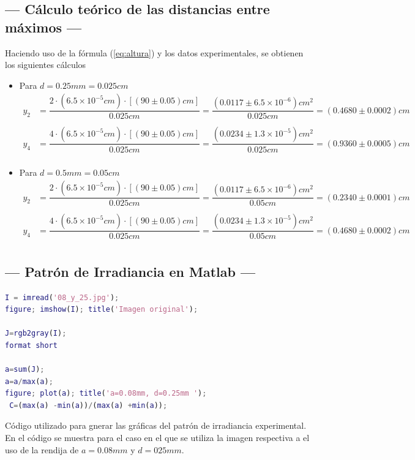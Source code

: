 \documentclass[12pt,a4paper]{article}
\begin{document}
	\subsection{--- Cálculo teórico de las distancias entre máximos ---}	
	Haciendo uso de la fórmula (\ref{eq:altura}) y los datos experimentales, se obtienen los siguientes cálculos
	\begin{itemize}
		\item Para $ d=0.25mm=0.025cm $
		\begin{align*}
			y_2&=\dfrac{2\cdot (6.5\times10^{-5}cm)\cdot[(90\pm 0.05) cm]}{0.025 cm}=
			\dfrac{(0.0117\pm 6.5\times 10^{-6}) cm^2}{0.025 cm}=
			(0.4680\pm 0.0002)cm\\\\
			y_4&=\dfrac{4\cdot (6.5\times10^{-5}cm)\cdot[(90\pm 0.05) cm]}{0.025 cm}=
			\dfrac{(0.0234\pm1.3\times 10^{-5})cm^2}{0.025 cm}=
			(0.9360\pm0.0005)cm\\
		\end{align*}
		\item Para $ d=0.5mm=0.05cm $
		\begin{align*}
			y_2&=\dfrac{2\cdot (6.5\times10^{-5}cm)\cdot[(90\pm 0.05) cm]}{0.025 cm}=
			\dfrac{(0.0117\pm 6.5\times 10^{-6}) cm^2}{0.05 cm}=
			(0.2340\pm 0.0001)cm\\\\
			y_4&=\dfrac{4\cdot (6.5\times10^{-5}cm)\cdot[(90\pm 0.05) cm]}{0.025 cm}=
			\dfrac{(0.0234\pm1.3\times 10^{-5})cm^2}{0.05 cm}=
			(0.4680\pm0.0002)cm\\
		\end{align*}	
	\end{itemize}
	\newpage
	\subsection{--- Patrón de Irradiancia en Matlab ---} %
	\label{sub:patron_irradiancia}
	\begin{lstlisting}[language = matlab]
I = imread('08_y_25.jpg');
figure; imshow(I); title('Imagen original');

J=rgb2gray(I);
format short

a=sum(J);
a=a/max(a);
figure; plot(a); title('a=0.08mm, d=0.25mm ');
 C=(max(a) -min(a))/(max(a) +min(a));
	\end{lstlisting}
	Código utilizado para gnerar las gráficas del patrón de irradiancia experimental. En el código se muestra para el caso en el que se utiliza la imagen respectiva a el uso de la rendija de \(a=0.08mm\) y \(d=025mm\).
\end{document}
